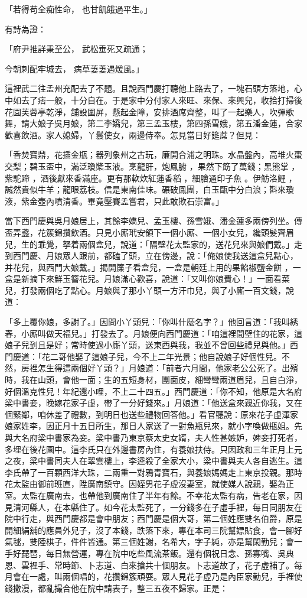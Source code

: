 「若得苟全痴性命，  也甘飢餓過平生。」

有詩為證：

「府尹推詳秉至公，  武松垂死又疏通；

今朝刺配牢城去，  病草萋萋遇煖風。」

這裡武二往孟州充配去了不題。且說西門慶打聽他上路去了，一塊石頭方落地，心中如去了痞一般，十分自在。于是家中分付家人來旺、來保、來興兒，收拾打掃後花園芙蓉亭乾淨，舖設圍屏，懸起金障，安排酒席齊整，叫了一起樂人，吹彈歌舞，請大娘子吳月娘，第二李嬌兒，第三孟玉樓，第四孫雪娥，第五潘金蓮，合家歡喜飲酒。家人媳婦，丫鬟使女，兩邊侍奉。怎見當日好筵蓆？但見：

「香焚寶鼎，花插金瓶；器列象州之古玩，廉開合浦之明珠。水晶盤內，高堆火棗交梨；碧玉盃中，滿泛瓊槳玉液。烹龍肝，炮鳳腑 ，果然下筯了萬錢；黑熊掌 ，紫駝蹄 ，酒後獻來香滿座。更有那軟炊紅蓮香稻 ，細膾通印子魚 。伊魴洛鯉 ，誠然貴似牛羊；龍眼荔枝。信是東南佳味。碾破鳳團，白玉甌中分白浪；斟來瓊液，紫金壺內噴清香。畢竟壓賽孟嘗君，只此敢欺石崇富。」

當下西門慶與吳月娘居上，其餘李嬌兒、孟玉樓、孫雪娥、潘金蓮多兩傍列坐。傳盃弄盞，花簇錦攢飲酒。只見小廝玳安領下一個小廝、一個小女兒，纔頭髮齊眉兒，生的乖覺，拏着兩個盒兒，說道：「隔壁花太監家的，送花兒來與娘們戴。」走到西門慶、月娘眾人跟前，都磕了頭，立在傍邊，說：「俺娘使我送這盒兒點心，并花兒，與西門大娘戴。」揭開簾子看盒兒，一盒是朝廷上用的果餡椒鹽金餅 ，一盒是新摘下來鮮玉簪花兒。月娘滿心歡喜，說道：「又叫你娘費心！」一面看菜兒，打發兩個吃了點心。月娘與了那小丫頭一方汗巾兒，與了小廝一百文錢，說道：

「多上覆你娘，多謝了。」因問小丫頭兒：「你叫什麼名字？」他回言道：「我叫綉春，小廝叫做天福兒。」打發去了。月娘便向西門慶道：「咱這裡間壁住的花家，這娘子兒到且是好；常時使過小廝丫頭，送東西與我，我並不曾回些禮兒與他。」西門慶道：「花二哥他娶了這娘子兒，今不上二年光景；他自說娘子好個性兒。不然，房裡怎生得這兩個好丫頭？」月娘道：「前者六月間，他家老公公死了。出殯時，我在山頭，會他一面；生的五短身材，團面皮，細彎彎兩道眉兒，且自白淨，好個溫克性兒！年紀還小哩，不上二十四五。」西門慶道：「你不知，他原是大名府梁中書妾，晚嫁花家子虛，帶了一分好錢來。」月娘道：「他送盒來親近你我，又在個緊鄰，咱休差了禮數，到明日也送些禮物回答他。」看官聽說：原來花子虛渾家娘家姓李，因正月十五日所生，那日人家送了一對魚瓶兒來，就小字喚做瓶姐。先與大名府梁中書家為妾。梁中書乃東京蔡太史女婿，夫人性甚嫉妒，婢妾打死者，多埋在後花園中。這李氏只在外邊書房內住，有養娘扶侍。只因政和三年正月上元之夜，梁中書同夫人在翠雲樓上，李逵殺了全家大小，梁中書與夫人各自逃生。這李氏帶了一百顆西洋大珠，二兩重一對鴉青寶石，與養娘媽媽走上東京投親。那時花太監由御前班直，陞廣南鎮守。因姪男花子虛沒妻室，就使媒人說親，娶為正室。太監在廣南去，也帶他到廣南住了半年有餘。不幸花太監有病，告老在家，因見清河縣人，在本縣住了。如今花太監死了，一分錢多在子虛手裡，每日同朋友在院中行走，與西門慶都是會中朋友；西門慶是個大哥，第二個姓應雙名伯爵，原是開細絹舖的應員外兒子，沒了本錢，跌落下來，專在本司三院幫嫖貼食，會一腳好氣毬，雙陸棋子，件件皆通。第三個姓謝，名希大，字子純，亦是幫閑勤兒；會一手好琵琶，每日無營運，專在院中吃些風流茶飯。還有個祝日念、孫寡嘴、吳典恩、雲裡手、常時節、卜志道、白來搶共十個朋友。卜志道故了，花子虛補了。每月會在一處，叫兩個唱的，花攢錦簇頑耍。眾人見花子虛乃是內臣家勤兒，手裡使錢撒漫，都亂撮合他在院中請表子，整三五夜不歸家。正是：

